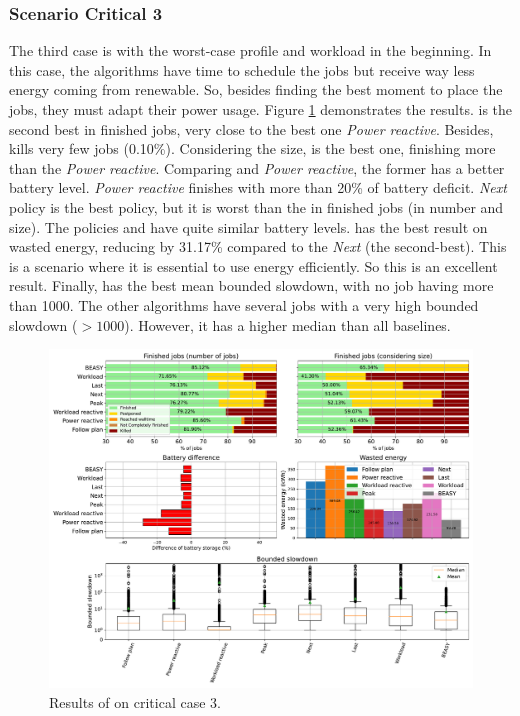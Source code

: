\clearpage

\subsubsection{Scenario Critical 3}

The third case is with the worst-case profile and workload in the beginning. In this case, the algorithms have time to schedule the jobs but receive way less energy coming from renewable. So, besides finding the best moment to place the jobs, they must adapt their power usage. Figure \ref{fig:beasy_critical_3} demonstrates the results. \emph{\systemName} is the second best in finished jobs, very close to the best one \emph{Power reactive}. Besides, \emph{\systemName} kills very few jobs (0.10\%). Considering the size, \emph{\systemName} is the best one, finishing more than the \emph{Power reactive}. Comparing \emph{\systemName} and \emph{Power reactive}, the former has a better battery level. \emph{Power reactive} finishes with more than 20\% of battery deficit. \emph{Next} policy is the best policy, but it is worst than the \emph{\systemName} in finished jobs (in number and size). The policies and \emph{\systemName} have quite similar battery levels. \emph{\systemName} has the best result on wasted energy, reducing by 31.17\% compared to the \emph{Next} (the second-best). This is a scenario where it is essential to use energy efficiently. So this is an excellent result. Finally, \emph{\systemName} has the best mean bounded slowdown, with no job having more than 1000. The other algorithms have several jobs with a very high bounded slowdown ($>1000$). However, it has a higher median than all baselines.

\begin{figure}[!htb]
    \centering
    \includegraphics[scale=0.39]{Images/Heuristic/profile_worst_workload_1_with_noise.pdf}
    \caption{Results of \emph{\systemName} on critical case 3.}
    \label{fig:beasy_critical_3}
\end{figure}

